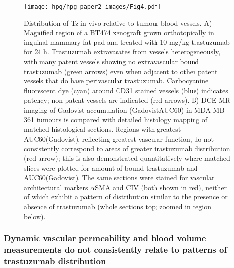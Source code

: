 \begin{figure}[htbp] %
  \centering
  \texttt{[image: hpg/hpg-paper2-images/Fig4.pdf]} 
  \captionsetup{width=1.2\linewidth}
  \caption{Distribution of Tz in vivo relative to tumour blood vessels. 
  A) Magnified region of a BT474 xenograft grown orthotopically in inguinal mammary fat pad and treated with 10 mg/kg trastuzumab for 24 h. 
  Trastuzumab extravasates from vessels heterogeneously, with many patent vessels showing no extravascular bound trastuzumab (green arrows) even when adjacent to other patent vessels that do have perivascular trastuzumab. 
  Carbocyanine fluorescent dye (cyan) around CD31 stained vessels (blue) indicates patency; non-patent vessels are indicated (red arrows). 
  B) DCE-MR imaging of Gadovist accumulation (GadovistAUC60) in MDA-MB-361 tumours is compared with detailed histology mapping of matched histological sections. 
  Regions with greatest AUC60(Gadovist), reflecting greatest vascular function, do not consistently correspond to areas of greater trastuzumab distribution (red arrow); this is also demonstrated quantitatively where matched slices were plotted for amount of bound trastuzumab and AUC60(Gadovist). 
  The same sections were stained for vascular architectural markers $\alpha$SMA and CIV (both shown in red), neither of which exhibit a pattern of distribution similar to the presence or absence of trastuzumab (whole sections top; zoomed in region below).}
  \label{hpgpaper2:fig4}
\end{figure}

\subsubsection{Dynamic vascular permeability and blood volume measurements do not consistently relate to patterns of trastuzumab distribution}

